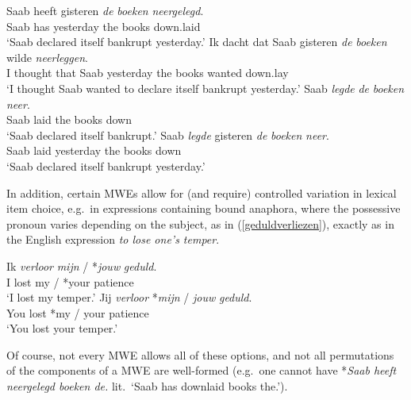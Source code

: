 \documentclass[output=paper,colorlinks,citecolor=brown]{langscibook}
\begin{document}
\begin{exe}
\ex \label{flex}
\begin{xlist}
\ex\label{flexa} \gll Saab heeft gisteren \textit{de} \textit{boeken} \textit{neergelegd}.\\
           Saab has yesterday the books down.laid\\
       \glt `Saab declared itself bankrupt yesterday.'
  \ex\label{flexb} \gll Ik dacht dat Saab gisteren \textit{de} \textit{boeken} wilde \textit{neerleggen}.\\
           I thought that Saab yesterday the books wanted down.lay\\
       \glt `I thought Saab wanted to declare itself bankrupt yesterday.'
   \ex\label{flexc} \gll Saab \textit{legde} \textit{de} \textit{boeken} \textit{neer}.\\
            Saab laid the books down\\
        \glt `Saab declared itself bankrupt.'
\ex\label{flexd}     \gll Saab \textit{legde} gisteren \textit{de} \textit{boeken} \textit{neer}.\\
             Saab laid yesterday the books down\\
        \glt `Saab declared itself bankrupt yesterday.'
\end{xlist}
\end{exe}
        
In addition, certain MWEs allow for (and require) controlled variation in lexical
item choice, e.g.\ in expressions containing bound anaphora, where the possessive pronoun varies depending on the subject, as in (\ref{geduldverliezen}), exactly as in the English expression \textit{to lose one’s temper}.

\begin{exe}
    \ex \label{geduldverliezen}
    \begin{xlist}
    \ex \gll Ik \textit{verloor} \textit{mijn} / *\textit{jouw} \textit{geduld}.\\
    I lost my / *your patience\\
    \glt `I lost my temper.'
    \ex \gll Jij \textit{verloor} *\textit{mijn} / \textit{jouw} \textit{geduld}.\\
    You lost *my / your patience\\
    \glt `You lost your temper.'
    \end{xlist}
\end{exe}

Of course, not every MWE allows all of these options, and not all permutations
of the components of a MWE are well-formed (e.g.\ one cannot have *\textit{Saab heeft
neergelegd boeken de.} lit.\ ‘Saab has downlaid books the.’).
\end{document}
